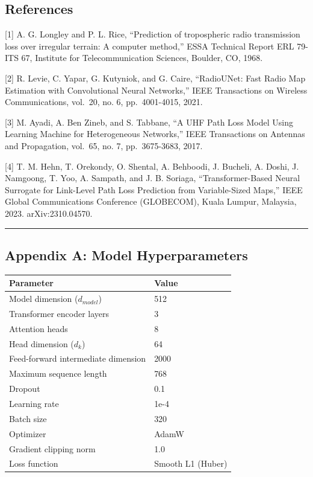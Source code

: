 \documentclass[
]{article}
\begin{document}
\subsection{References}\label{references}

{[}1{]} A. G. Longley and P. L. Rice, ``Prediction of tropospheric radio
transmission loss over irregular terrain: A computer method,'' ESSA
Technical Report ERL 79-ITS 67, Institute for Telecommunication
Sciences, Boulder, CO, 1968.

{[}2{]} R. Levie, C. Yapar, G. Kutyniok, and G. Caire, ``RadioUNet: Fast
Radio Map Estimation with Convolutional Neural Networks,'' IEEE
Transactions on Wireless Communications, vol.~20, no. 6, pp.~4001-4015,
2021.

{[}3{]} M. Ayadi, A. Ben Zineb, and S. Tabbane, ``A UHF Path Loss Model
Using Learning Machine for Heterogeneous Networks,'' IEEE Transactions
on Antennas and Propagation, vol.~65, no. 7, pp.~3675-3683, 2017.

{[}4{]} T. M. Hehn, T. Orekondy, O. Shental, A. Behboodi, J. Bucheli, A.
Doshi, J. Namgoong, T. Yoo, A. Sampath, and J. B. Soriaga,
``Transformer-Based Neural Surrogate for Link-Level Path Loss Prediction
from Variable-Sized Maps,'' IEEE Global Communications Conference
(GLOBECOM), Kuala Lumpur, Malaysia, 2023. arXiv:2310.04570.

\begin{center}\rule{0.5\linewidth}{0.5pt}\end{center}

\subsection{Appendix A: Model
Hyperparameters}\label{appendix-a-model-hyperparameters}

\begin{longtable}[]{@{}ll@{}}
\toprule\noalign{}
Parameter & Value \\
\midrule\noalign{}
\endhead
\bottomrule\noalign{}
\endlastfoot
Model dimension (\(d_{model}\)) & 512 \\
Transformer encoder layers & 3 \\
Attention heads & 8 \\
Head dimension (\(d_k\)) & 64 \\
Feed-forward intermediate dimension & 2000 \\
Maximum sequence length & 768 \\
Dropout & 0.1 \\
Learning rate & 1e-4 \\
Batch size & 320 \\
Optimizer & AdamW \\
Gradient clipping norm & 1.0 \\
Loss function & Smooth L1 (Huber) \\
\end{longtable}
\end{document}
